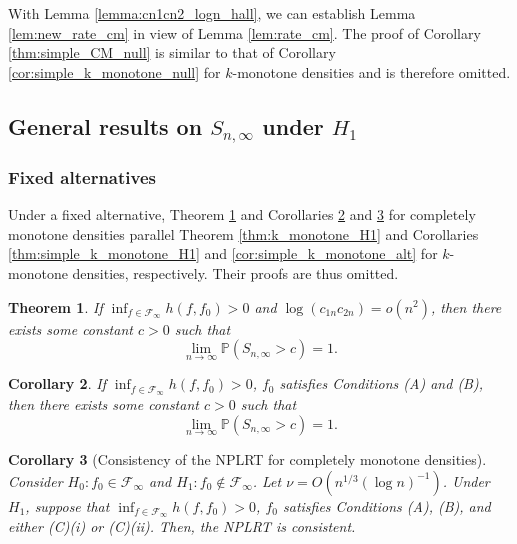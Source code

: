 \documentclass[12pt,letterpaper, twoside, openany]{article}
\theoremstyle{plain}
\newtheorem{theorem}{Theorem}[section]
\newtheorem{corollary}[theorem]{Corollary}
\begin{document}
With Lemma \ref{lemma:cn1cn2_logn_hall}, we can establish Lemma \ref{lem:new_rate_cm} in view of Lemma \ref{lem:rate_cm}. The proof of Corollary \ref{thm:simple_CM_null} is similar to that of Corollary \ref{cor:simple_k_monotone_null} for $k$-monotone densities and is therefore omitted. 

\subsection{General results on $S_{n,\infty}$ under $H_1$}
\subsubsection{Fixed alternatives}
Under a fixed alternative, Theorem \ref{thm:C_monotone_H1} and Corollaries \ref{thm:simple_C_monotone_H1} and \ref{cor:simple_C_monotone_alt} for completely monotone densities parallel Theorem \ref{thm:k_monotone_H1} and Corollaries \ref{thm:simple_k_monotone_H1} and \ref{cor:simple_k_monotone_alt} for $k$-monotone densities, respectively. Their proofs are thus omitted.
	\begin{theorem}\label{thm:C_monotone_H1}
			If $\inf_{f \in \mathcal{F}_\infty}h(f, f_0) > 0$ and $\log (c_{1n} c_{2n}) = o(n^{2})$, then there exists some constant $c> 0$ such that
			\begin{equation*}
				\lim_{n\rightarrow \infty} \mathbb{P} ( S_{n,\infty} > c )  = 1. 
			\end{equation*}	
		\end{theorem}
    	\begin{corollary}\label{thm:simple_C_monotone_H1}
			If $\inf_{f \in \mathcal{F}_\infty}h(f, f_0) > 0$, $f_0$ satisfies Conditions (A) and (B), then there exists some constant $c> 0$ such that
			\begin{equation*}
				\lim_{n\rightarrow \infty} \mathbb{P} ( S_{n,\infty} > c )  = 1. 
			\end{equation*}	
		\end{corollary}


     
		\begin{corollary}[Consistency of the NPLRT for completely monotone densities]\label{cor:simple_C_monotone_alt}
			Consider $H_0: f_0 \in \mathcal{F}_\infty$ and $H_1: f_0 \notin \mathcal{F}_\infty$. Let $\nu = O(n^{1/3}(\log n)^{-1})$. Under $H_1$, suppose that  $\inf_{f \in \mathcal{F}_\infty}h(f, f_0) > 0$, $f_0$ satisfies Conditions (A), (B), and either (C)(i) or (C)(ii). Then, the NPLRT is consistent.
		\end{corollary}
\end{document}
